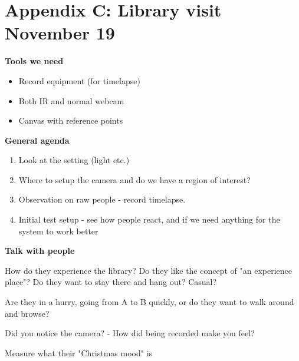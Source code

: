 \chapter{Appendix C: Library visit November 19}\label{targetgroup_visit}
\textbf{Tools we need}
\begin{itemize}
\item Record equipment (for timelapse)
\item Both IR and normal webcam
\item Canvas with reference points
\end{itemize}

\textbf{General agenda}
\begin{enumerate}
\item Look at the setting (light etc.)
\item Where to setup the camera and do we have a region of interest?
\item Observation on raw people - record timelapse.
\item Initial test setup - see how people react, and if we need anything for the system to work better
\end{enumerate}

\textbf{Talk with people}

How do they experience the library? Do they like the concept of "an experience place"? Do they want to stay there and hang out? Casual?

Are they in a hurry, going from A to B quickly, or do they want to walk around and browse?

Did you notice the camera?
- How did being recorded make you feel?

Measure what their "Christmas mood" is